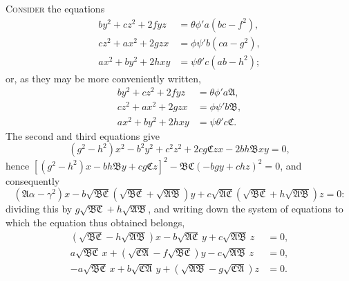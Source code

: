 \documentclass[11pt,a4paper]{article}
\theoremstyle{definition}
\begin{document}
\textsc{Consider} the equations
\begin{align*}
by^{2} + cz^{2} + 2fyz &= \theta\phi' a(bc - f^{2}), \\
cz^{2} + ax^{2} + 2gzx &= \phi\psi' b(ca - g^{2}), \\
ax^{2} + by^{2} + 2hxy &= \psi\theta' c(ab - h^{2});
\end{align*}
or, as they may be more conveniently written,
\begin{align*}
by^{2} + cz^{2} + 2fyz &= \theta\phi' a\mathfrak{A}, \\
cz^{2} + ax^{2} + 2gzx &= \phi\psi' b\mathfrak{B}, \\
ax^{2} + by^{2} + 2hxy &= \psi\theta' c\mathfrak{C}.
\end{align*}
The second and third equations give
\[
(g^{2} - h^{2})x^{2} - b^{2}y^{2} + c^{2}z^{2} + 2cg\mathfrak{C}zx - 2bh\mathfrak{B}xy = 0,
\]
hence $[(g^{2} - h^{2})x - bh\mathfrak{B}y + cg\mathfrak{C}z]^{2} - \mathfrak{B}\mathfrak{C}(-bgy + chz)^{2} = 0$, and consequently
\[
(\mathfrak{A}\alpha - \gamma^{2})x - b\sqrt{\mathfrak{B}\mathfrak{C}}(\sqrt{\mathfrak{B}\mathfrak{C}} + \sqrt{\mathfrak{A}\mathfrak{B}})y + c\sqrt{\mathfrak{A}\mathfrak{C}}(\sqrt{\mathfrak{B}\mathfrak{C}} + h\sqrt{\mathfrak{A}\mathfrak{B}})z = 0:
\]
dividing this by $g\sqrt{\mathfrak{B}\mathfrak{C}} + h\sqrt{\mathfrak{A}\mathfrak{B}}$, and writing down the system of equations to which the equation thus obtained belongs,
\begin{align*}
(\sqrt{\mathfrak{B}\mathfrak{C}} - h\sqrt{\mathfrak{A}\mathfrak{B}})x - b\sqrt{\mathfrak{A}\mathfrak{C}}\,y + c\sqrt{\mathfrak{A}\mathfrak{B}}\,z &= 0, \\
a\sqrt{\mathfrak{B}\mathfrak{C}}\,x + (\sqrt{\mathfrak{C}\mathfrak{A}} - f\sqrt{\mathfrak{B}\mathfrak{C}})y - c\sqrt{\mathfrak{A}\mathfrak{B}}\,z &= 0, \\
-a\sqrt{\mathfrak{B}\mathfrak{C}}\,x + b\sqrt{\mathfrak{C}\mathfrak{A}}\,y + (\sqrt{\mathfrak{A}\mathfrak{B}} - g\sqrt{\mathfrak{C}\mathfrak{A}})z &= 0.
\end{align*}

\newpage

\setcounter{page}{466}
\end{document}
